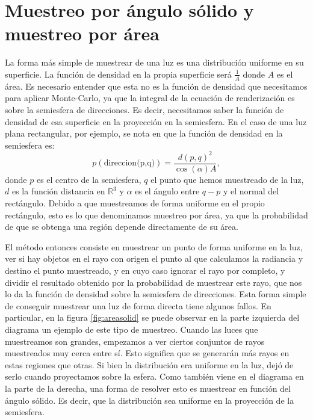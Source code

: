 \documentclass{scrbook}
\begin{document}
\section{Muestreo por ángulo sólido y muestreo por área}
\label{areaangulo}
La forma más simple de muestrear de una luz es una distribución uniforme en su superficie. La función de densidad en la propia superficie será $\frac{1}{A}$ donde $A$ es el área. Es necesario entender que esta no es la función de densidad que necesitamos para aplicar Monte-Carlo, ya que la integral de la ecuación de renderización es sobre la semiesfera de direcciones. Es decir, necesitamos saber la función de densidad de esa superficie en la proyección en la semiesfera. En el caso de una luz plana rectangular, por ejemplo, se nota en  \cite[Sección~9]{RestOfYourLife} que la función de densidad en la semiesfera es:
\begin{equation}\label{eq:area}
p(\text{direccion(p,q)}) = \frac{d(p,q)^2}{\cos(\alpha)A},
\end{equation}
donde $p$ es el centro de la semiesfera, $q$ el punto que hemos muestreado de la luz, $d$ es la función distancia en $\mathds{R}^3$ y $\alpha$ es el ángulo entre $q-p$ y el normal del rectángulo. Debido a que muestreamos de forma uniforme en el propio rectángulo, esto es lo que denominamos muestreo por área, ya que la probabilidad de que se obtenga una región depende directamente de su área.

El método entonces consiste en muestrear un punto de forma uniforme en la luz, ver si hay objetos en el rayo con origen el punto al que calculamos la radiancia y destino el punto muestreado, y en cuyo caso ignorar el rayo por completo, y dividir el resultado obtenido por la probabilidad de muestrear este rayo, que nos lo da la función de densidad sobre la semiesfera de direcciones. Esta forma simple de conseguir muestrear una luz de forma directa tiene algunos fallos. En particular, en la figura \ref{fig:areasolid} se puede observar en la parte izquierda del diagrama un ejemplo de este tipo de muestreo. Cuando las luces que muestreamos son grandes, empezamos a ver ciertos conjuntos de rayos muestreados muy cerca entre sí. Esto significa que se generarán más rayos en estas regiones que otras. Si bien la distribución era uniforme en la luz, dejó de serlo cuando proyectamos sobre la esfera. Como también viene en el diagrama en la parte de la derecha, una forma de resolver esto es muestrear en función del ángulo sólido. Es decir, que la distribución sea uniforme en la proyección de la semiesfera.
\end{document}
